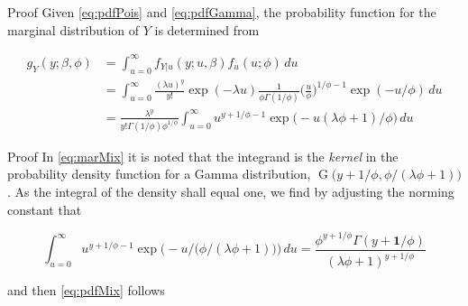 \documentclass[aspectratio=169]{beamer}
\DeclareMathOperator{\G}{G}
\begin{document}
\begin{frame}{Proof}
\protect\hypertarget{proof-1}{}
Given \eqref{eq:pdfPois} and \eqref{eq:pdfGamma}, the probability
function for the marginal distribution of \(Y\) is determined from

\begin{equation} \label{eq:marMix}
  \begin{aligned}
    g_{Y}(y;\beta,\phi)&=\int_{u=0}^\infty f_{Y|u}(y;u,\beta) f_{u}(u;\phi) \,du \\
    &=\int_{u=0}^\infty \frac{(\lambda u)^y}{y!} \exp (-\lambda u) \frac{1}{\phi \Gamma(1/\phi)} \bigg(\frac{u}{\phi}\bigg)^{1/\phi-1} \exp (-u /\phi) \,du\\
    &=\frac{\lambda^{y}}{y!\Gamma(1/\phi)\phi^{1/\phi}} \int_{u=0}^\infty u^{y+1/\phi-1} \exp \big(-u(\lambda \phi+1)/\phi\big) \,du
  \end{aligned}
\end{equation}
\end{frame}

\begin{frame}{Proof}
\protect\hypertarget{proof-2}{}
In \eqref{eq:marMix} it is noted that the integrand is the \emph{kernel}
in the probability density function for a Gamma distribution,
\(\G\big(y+1/\phi,\phi/(\lambda \phi+1)\big)\). As the integral of the
density shall equal one, we find by adjusting the norming constant that

\begin{equation}
  \int_{u=0}^\infty  u^{ y+ 1/\phi-1} \exp \Big(- u/\big(\phi/( \lambda \phi+1)\big)\Big) \,du = \frac{\phi^{ y+ 1/\phi}\Gamma( y+\boldsymbol 1/\phi)}{( \lambda \phi + 1)^{y+1/\phi}}
\end{equation}

and then \eqref{eq:pdfMix} follows
\end{frame}
\end{document}

